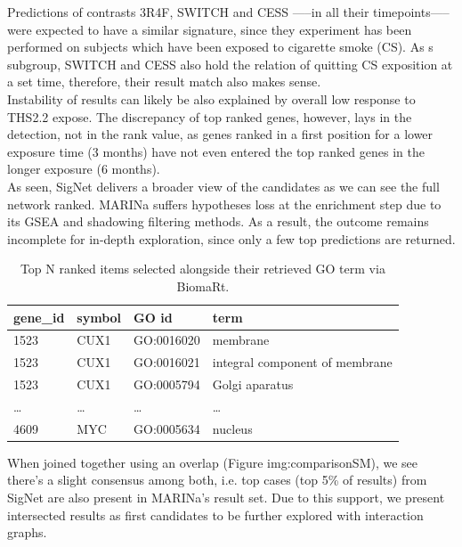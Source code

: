 Predictions of contrasts 3R4F, SWITCH and CESS —--in all their timepoints—-- were expected to have a similar signature, since they experiment has been performed on subjects which have been exposed to cigarette smoke (CS). As s subgroup, SWITCH and CESS also hold the relation of quitting CS exposition at a set time, therefore, their result match also makes sense.
\\

Instability of results can likely be also explained by overall low response to THS2.2 expose. The discrepancy of top ranked genes, however, lays in the detection, not in the rank value, as genes ranked in a first position for a lower exposure time (3 months) have not even entered the top ranked genes in the longer exposure (6 months).
\\

As seen, SigNet delivers a broader view of the candidates as we can see the full network ranked. MARINa suffers hypotheses loss at the enrichment step due to its GSEA and shadowing filtering methods. As a result, the outcome remains incomplete for in-depth exploration, since only a few top predictions are returned.
\\

\begin{table}[h]
\centering
\begin{tabular}{|l|l|l|l|}
\hline
gene\_id & symbol & GO id      & term                           \\ \hline
1523     & CUX1   & GO:0016020 & membrane                       \\ \hline
1523     & CUX1   & GO:0016021 & integral component of membrane \\ \hline
1523     & CUX1   & GO:0005794 & Golgi aparatus                 \\ \hline
…        & …      & …          & …                              \\ \hline
4609     & MYC    & GO:0005634 & nucleus                        \\ \hline
\end{tabular}
\caption{Top N ranked items selected alongside their retrieved GO term via BiomaRt.}
\label{tbl:goterms}
\end{table}

When joined together using an overlap (Figure img:comparisonSM), we see there’s a slight consensus among both, i.e. top cases (top 5\% of results) from SigNet are also present in MARINa’s result set. Due to this support, we present intersected results as first candidates to be further explored with interaction graphs.
\\


